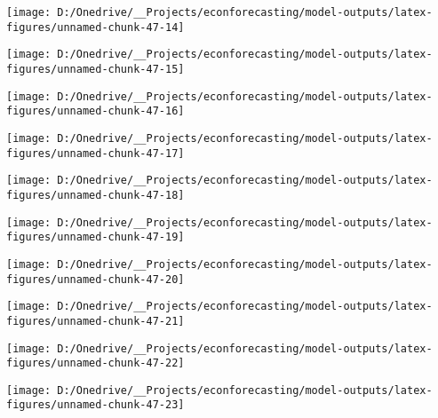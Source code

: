 \documentclass[11pt, letterpaper]{article}\usepackage[]{graphicx}\usepackage[]{color}
\begin{document}
{\centering \texttt{[image: D:/Onedrive/\_\_Projects/econforecasting/model-outputs/latex-figures/unnamed-chunk-47-14]} 

}




{\centering \texttt{[image: D:/Onedrive/\_\_Projects/econforecasting/model-outputs/latex-figures/unnamed-chunk-47-15]} 

}




{\centering \texttt{[image: D:/Onedrive/\_\_Projects/econforecasting/model-outputs/latex-figures/unnamed-chunk-47-16]} 

}




{\centering \texttt{[image: D:/Onedrive/\_\_Projects/econforecasting/model-outputs/latex-figures/unnamed-chunk-47-17]} 

}




{\centering \texttt{[image: D:/Onedrive/\_\_Projects/econforecasting/model-outputs/latex-figures/unnamed-chunk-47-18]} 

}




{\centering \texttt{[image: D:/Onedrive/\_\_Projects/econforecasting/model-outputs/latex-figures/unnamed-chunk-47-19]} 

}




{\centering \texttt{[image: D:/Onedrive/\_\_Projects/econforecasting/model-outputs/latex-figures/unnamed-chunk-47-20]} 

}




{\centering \texttt{[image: D:/Onedrive/\_\_Projects/econforecasting/model-outputs/latex-figures/unnamed-chunk-47-21]} 

}




{\centering \texttt{[image: D:/Onedrive/\_\_Projects/econforecasting/model-outputs/latex-figures/unnamed-chunk-47-22]} 

}




{\centering \texttt{[image: D:/Onedrive/\_\_Projects/econforecasting/model-outputs/latex-figures/unnamed-chunk-47-23]} 

}
\end{document}
